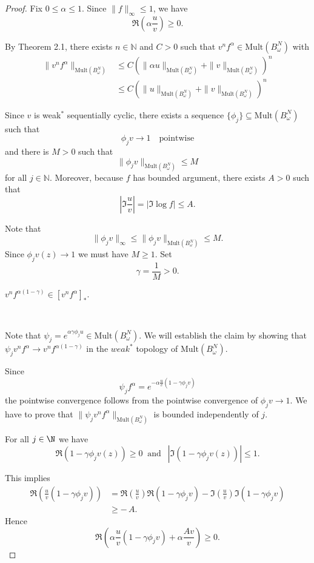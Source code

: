 \documentclass{article}
\numberwithin{equation}{section}
\begin{document}
\begin{proof} Fix $0\le \alpha \le 1$. Since $\|f\|_{\infty} \leq 1$, we have 
\[
\Re\!\left(\alpha \frac{u}{v}\right) \geq 0.
\]

By Theorem 2.1, there exists $n \in \mathbb{N}$ and $C>0$ such that 
$ v^{n} f^\alpha \in \mathrm{Mult}(B^{N}_{\omega})$ with 
\begin{align}\label{equ:v^nf}
 \|v^n f^\alpha\|_{\mathrm{Mult}(B^{N}_{\omega})}&\le C(\|\alpha u\|_{\mathrm{Mult}(B^{N}_{\omega})}+\|v\|_{\mathrm{Mult}(B^{N}_{\omega})})^n \nonumber \\
 &\le C(\| u\|_{\mathrm{Mult}(B^{N}_{\omega})}+\|v\|_{\mathrm{Mult}(B^{N}_{\omega})})^n
\end{align}


Since $v$ is weak$^\ast$ sequentially cyclic, there exists a sequence $\{\phi_{j}\} \subseteq  \mathrm{Mult}(B^{N}_{\omega})$ such that
\[
\phi_{j} v \to 1 \quad \text{pointwise}
\]
and there is $M>0$ such that
\[
\|\phi_{j} v\|_{\mathrm{Mult}(B^{N}_{\omega})} \leq M
\]
 for all $ j \in \mathbb{N}$. Moreover, because $f$ has bounded argument, there exists $A > 0$ such that
\[
|\Im \frac{u}{v}|=|\Im \log f| \leq A.
\]

Note that
\[
\|\phi_{j} v\|_{\infty}
\leq
\|\phi_{j} v\|_{\mathrm{Mult}(B^{N}_{\omega})}
\leq M.
\]
Since $\phi_jv(z)\to 1$ we must have $M\ge 1$. 
Set
\[
\gamma = \frac{1}{M}>0.
\]

  $v^n f^{\alpha(1-\gamma)}\in [v^n f^\alpha]_\ast$.

\

Note that $\psi_j= e^{\alpha \gamma \phi_{j} u} \in \mathrm{Mult}(B^{N}_{\omega})$. We will establish the claim by showing that $\psi_j v^n f^\alpha \to v^n f^{\alpha(1-\gamma)}$ in the $weak^\ast$ topology of $\mathrm{Mult}(B^{N}_{\omega})$. 

Since $$\psi_jf^\alpha= e^{-\alpha \frac{u}{v}(1-\gamma \phi_j v)}$$ the pointwise convergence follows from the pointwise convergence of $\phi_jv\to 1$. We have to prove that $\|\psi_jv^nf^\alpha\|_{\mathrm{Mult}(B^{N}_{\omega})}$ is bounded independently of $j$.


For all $j\in \N$ we have
$$\Re(1 - \gamma \phi_{j} v(z)) \geq 0 \ \text{ and } \ \
|\Im(1 - \gamma \phi_{j} v(z))| \leq 1.$$


 


This implies
\begin{align*}
\Re\!\left( \frac{u}{v} (1 - \gamma \phi_{j} v) \right)
&=
\Re\!\left(  \frac{u}{v} \right)
\Re(1 - \gamma \phi_{j} v)
-
\Im\!\left( \frac{u}{v} \right)
\Im(1 - \gamma \phi_{j} v) \\
&\geq - \,  A.
\end{align*}
Hence 
\[
\Re\!\left(
\alpha \frac{u}{v} (1 - \gamma \phi_{j} v)
+
\alpha \frac{ A v}{v}
\right)
\geq 0.
\]


\end{proof}
\end{document}
